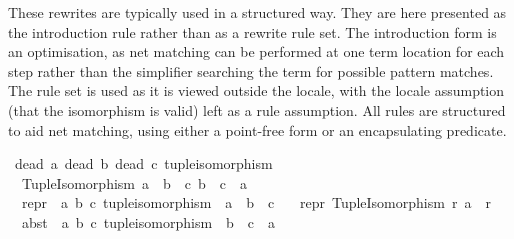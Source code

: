 \begin{isabellebody}
\begin{isamarkuptext}
  These rewrites are typically used in a structured way. They are here
  presented as the introduction rule 
  rather than as a rewrite rule set. The introduction form is an
  optimisation, as net matching can be performed at one term location
  for each step rather than the simplifier searching the term for
  possible pattern matches. The rule set is used as it is viewed
  outside the locale, with the locale assumption (that the isomorphism
  is valid) left as a rule assumption. All rules are structured to aid
  net matching, using either a point-free form or an encapsulating
  predicate.%
\end{isamarkuptext}\isamarkuptrue%
%
\isadelimdocument
%
\endisadelimdocument
%
\isatagdocument
%
\isamarkuptrue%
%
\endisatagdocument
{\isafolddocument}%
%
\isadelimdocument
%
\endisadelimdocument
{}\isamarkupfalse%
\ {\isacharparenleft}{\kern0pt}dead\ {\isacharprime}{\kern0pt}a{\isacharcomma}{\kern0pt}\ dead\ {\isacharprime}{\kern0pt}b{\isacharcomma}{\kern0pt}\ dead\ {\isacharprime}{\kern0pt}c{\isacharparenright}{\kern0pt}\ tuple{\isacharunderscore}{\kern0pt}isomorphism\ {\isacharequal}{\kern0pt}\isanewline
\ \ Tuple{\isacharunderscore}{\kern0pt}Isomorphism\ {\isachardoublequoteopen}{\isacharprime}{\kern0pt}a\ {\isasymRightarrow}\ {\isacharprime}{\kern0pt}b\ {\isasymtimes}\ {\isacharprime}{\kern0pt}c{\isachardoublequoteclose}\ {\isachardoublequoteopen}{\isacharprime}{\kern0pt}b\ {\isasymtimes}\ {\isacharprime}{\kern0pt}c\ {\isasymRightarrow}\ {\isacharprime}{\kern0pt}a{\isachardoublequoteclose}\isanewline
\isanewline
{}\isamarkupfalse%
\isanewline
\ \ repr\ {\isacharcolon}{\kern0pt}{\isacharcolon}{\kern0pt}\ {\isachardoublequoteopen}{\isacharparenleft}{\kern0pt}{\isacharprime}{\kern0pt}a{\isacharcomma}{\kern0pt}\ {\isacharprime}{\kern0pt}b{\isacharcomma}{\kern0pt}\ {\isacharprime}{\kern0pt}c{\isacharparenright}{\kern0pt}\ tuple{\isacharunderscore}{\kern0pt}isomorphism\ {\isasymRightarrow}\ {\isacharprime}{\kern0pt}a\ {\isasymRightarrow}\ {\isacharprime}{\kern0pt}b\ {\isasymtimes}\ {\isacharprime}{\kern0pt}c{\isachardoublequoteclose}\ \isanewline
\ \ {\isachardoublequoteopen}repr\ {\isacharparenleft}{\kern0pt}Tuple{\isacharunderscore}{\kern0pt}Isomorphism\ r\ a{\isacharparenright}{\kern0pt}\ {\isacharequal}{\kern0pt}\ r{\isachardoublequoteclose}\isanewline
\isanewline
{}\isamarkupfalse%
\isanewline
\ \ abst\ {\isacharcolon}{\kern0pt}{\isacharcolon}{\kern0pt}\ {\isachardoublequoteopen}{\isacharparenleft}{\kern0pt}{\isacharprime}{\kern0pt}a{\isacharcomma}{\kern0pt}\ {\isacharprime}{\kern0pt}b{\isacharcomma}{\kern0pt}\ {\isacharprime}{\kern0pt}c{\isacharparenright}{\kern0pt}\ tuple{\isacharunderscore}{\kern0pt}isomorphism\ {\isasymRightarrow}\ {\isacharprime}{\kern0pt}b\ {\isasymtimes}\ {\isacharprime}{\kern0pt}c\ {\isasymRightarrow}\ {\isacharprime}{\kern0pt}a{\isachardoublequoteclose}\ \isanewline

\end{isabellebody}
